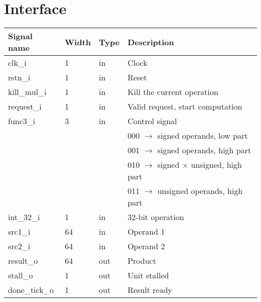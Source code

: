 \section{Interface}
\label{chapter 4}

\begin{table}[H]
\centering
\begin{tabular}{llll}
\textbf{Signal name} & \textbf{Width} & \textbf{Type} & \textbf{Description} \\
\hline
clk\_i & 1 & in & Clock \\
rstn\_i & 1 & in & Reset \\
kill\_mul\_i & 1 & in & Kill the current operation \\
request\_i & 1 & in & Valid request, start computation \\
func3\_i & 3 & in & Control signal \\
 &  &  & 000 $\rightarrow$ signed operands, low part \\
 &  &  & 001 $\rightarrow$ signed operands, high part \\
 &  &  & 010 $\rightarrow$ signed $\times$ unsigned, high part \\
 &  &  & 011 $\rightarrow$ unsigned operands, high part \\
int\_32\_i & 1 & in & 32-bit operation \\
src1\_i & 64 & in & Operand 1 \\
src2\_i & 64 & in & Operand 2 \\
result\_o & 64 & out & Product \\
stall\_o & 1 & out & Unit stalled \\
done\_tick\_o & 1 & out & Result ready \\
\end{tabular}
\end{table}
